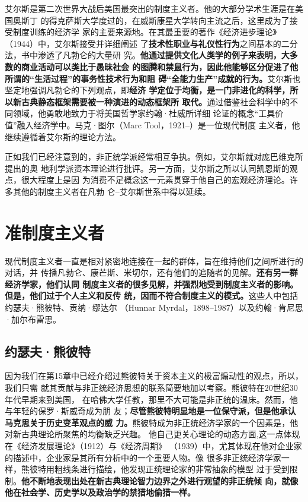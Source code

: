 艾尔斯是第二次世界大战后美国最突出的制度主义者。他的大部分学术生涯是在美国奥斯丁
的得克萨斯大学度过的，在威斯康星大学转向主流之后，这里成为了接受制度训练的经济学
家的主要来源地。在其最重要的著作《经济进步理论》（1944）中，艾尔斯接受并详细阐述
了\textbf{技术性职业与礼仪性行为}之间基本的二分法，书中渗透了凡勃仑的大量研
究。\textbf{他通过提供文化人类学的例子来表明，大多数的商业活动可以类比于愚昧社会
  的图腾和禁鼠行为，因此他能够区分促进了他所谓的“生活过程”的事务性技术行为和阻
  碍“全能力生产”成就的行为。}艾尔斯也坚定地强调凡勃仑的下列观点，即\textbf{经济
  学定位于均衡，是一门非进化的科学，所以新古典静态框架需要被一种演进的动态框架所
  取代。}通过借鉴社会科学中的不同领域，他勇敢地致力于将美国哲学家约翰·杜威所详细
论证的概念“工具价值”融入经济学中。马克·图尔（Marc Tool，1921--）是一位现代制度
主义者，他继续遵循着艾尔斯的理论方法。

正如我们已经注意到的，非正统学派经常相互争执。例如，艾尔斯就对庞巴维克所提出的奥
地利学派资本理论进行批评。另一方面，艾尔斯之所以认同凯恩斯的观点，很大程度上是因
为消费不足概念这一元素贯穿于他自己的宏观经济理论。许多其他的制度主义者在凡勃
仑--艾尔斯世系中得以延续。
\clearpage

\section{准制度主义者}

现代制度主义者一直是相对紧密地连接在一起的群体，旨在维持他们之间所进行的对话，并
传播凡勃仑、康芒斯、米切尔，还有他们的追随者的见解。\textbf{还有另一群经济学家，他们认同
制度主义者的很多见解，并强烈地受到制度主义者的影响。但是，他们过于个人主义和反传
统，因而不符合制度主义的模式。}这些人中包括约瑟夫·熊彼特、贡纳·缪达尔
（Hunnar Myrdal，1898--1987）以及约翰·肯尼思·加尔布雷思。

\subsection{约瑟夫·熊彼特}

因为我们在第15章中已经介绍过熊彼特关于资本主义的极富煽动性的观点，所以，我们只需
就其贡献与非正统经济思想的联系简要地加以考察。熊彼特在20世纪30年代早期来到美国，
在哈佛大学任教，那里不大可能是非正统的温床。然而，他与年轻的保罗·斯威奇成为朋
友；\textbf{尽管熊彼特明显地是一位保守派，但是他承认马克思关于历史变革观点的威
  力。}熊彼特成为非正统经济学家的一个因素是，他对新古典理论所聚焦的均衡缺乏兴趣。
他自己更关心理论的动态方面,这一点体现在《经济发展理论》（1912）与《经济周期》
（1939）中，尤其体现在他对企业家的描述中，企业家是其所有分析中的一个重要人物。像
很多非正统经济学家一样，熊彼特用粗线条进行描绘，他发现正统理论家的非常抽象的模型
过于受到限制。\textbf{他不断地表现出处在新古典理论智力边界之外进行观望的非正统倾
  向，就像他在社会学、历史学以及政治学的禁猎地偷猎一样。}

